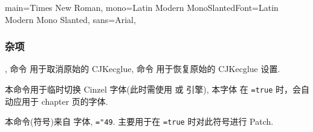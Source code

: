 \begin{DocExample}
\zfontfamilyset
  {
    main={Times New Roman}{},
    mono={Latin Modern Mono}{SlantedFont=Latin Modern Mono Slanted},
    sans={Arial}{},
  }
\end{DocExample}



\clearpage
\subsubsection{杂项}
\begin{function}[added=2025-09-03]{\removeCJKecglue, \restoreCJKecglue}
  命令 \cmd{\removeCJKecglue} 用于取消原始的 CJKecglue,
  命令 \cmd{\restoreCJKecglue} 用于恢复原始的 CJKecglue 设置.
\end{function}


\begin{function}[updated=2025-04-25]{\cinzel}
  \begin{syntax}
    \cmd{\cinzel}
  \end{syntax}
  本命令用于临时切换 Cinzel 字体(此时需使用  或  引擎), 本字体
  在 \texttt{=true} 时，会自动应用于 chapter 页的字体.
\end{function}


\begin{function}[updated=2024-12-05]{\blacktriangleright}
本命令(符号)来自  字体, \texttt{=\string"49}. 主要用于在 \texttt{=true} 时对此符号进行 Patch.
\end{function}